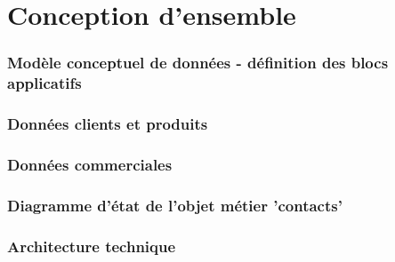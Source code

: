 \part{Conception d'ensemble}
\setcounter{section}{0}

\section{Modèle conceptuel de données - définition des blocs applicatifs} 
\section{Données clients et produits} 
\section{Données commerciales}
\section{Diagramme d’état de l'objet métier 'contacts'}
\section{Architecture technique}
